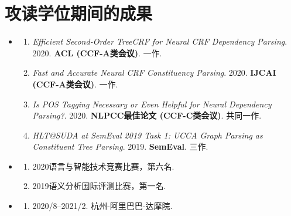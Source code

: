 \chapter{攻读学位期间的成果}

\begin{itemize}
	\setlength{\itemsep}{5pt}

	\item \textbf{\heiti{}}
	      \begin{enumerate}
		      \setlength{\itemsep}{-\itemsep}  %

		      \item \emph{Efficient Second-Order TreeCRF for Neural CRF Dependency Parsing}.
		            2020. \textbf{ACL (CCF-A类会议)}. 一作.
		      \item \emph{Fast and Accurate Neural CRF Constituency Parsing}.
		            2020. \textbf{IJCAI (CCF-A类会议)}. 一作.
		      \item \emph{Is POS Tagging Necessary or Even Helpful for Neural Dependency Parsing?}.
		            2020. \textbf{NLPCC最佳论文 (CCF-C类会议)}. 共同一作.
		      \item \emph{HLT@SUDA at SemEval 2019 Task 1: UCCA Graph Parsing as Constituent Tree Parsing}.
		            2019. \textbf{SemEval}. 三作.

	      \end{enumerate}

	\item \textbf{\heiti{}}
	      \begin{enumerate}
		      \item 2020语言与智能技术竞赛比赛，第六名.
		      \item 2019语义分析国际评测比赛，第一名.
	      \end{enumerate}

	\item \textbf{\heiti{}}
	      \begin{enumerate}
		      \item \textsc{2020/8--2021/2}. 杭州-阿里巴巴-达摩院.
	      \end{enumerate}

\end{itemize}
